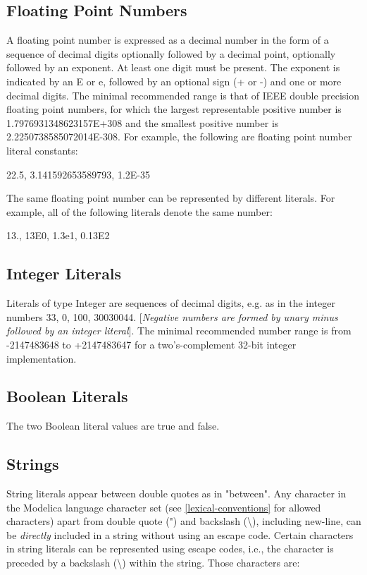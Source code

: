 \documentclass[10pt,a4paper]{report}
\def\doublelabel#1{\label{#1}}
\begin{document}
\subsection{Floating Point Numbers}\doublelabel{floating-point-numbers}

A floating point number is expressed as a decimal number in the form of
a sequence of decimal digits optionally followed by a decimal point,
optionally followed by an exponent. At least one digit must be present.
The exponent is indicated by an E or e, followed by an optional sign (+
or -) and one or more decimal digits. The minimal recommended range is
that of IEEE double precision floating point numbers, for which the
largest representable positive number is 1.7976931348623157E+308 and the
smallest positive number is 2.2250738585072014E-308. For example, the
following are floating point number literal constants:

22.5, 3.141592653589793, 1.2E-35

The same floating point number can be represented by different literals.
For example, all of the following literals denote the same number:

13., 13E0, 1.3e1, 0.13E2

\subsection{Integer Literals}\doublelabel{integer-literals}

Literals of type Integer are sequences of decimal digits, e.g. as in the
integer numbers 33, 0, 100, 30030044. {[}\emph{Negative numbers are
formed by unary minus followed by an integer literal}{]}. The minimal
recommended number range is from -2147483648 to +2147483647 for a
two's-complement 32-bit integer implementation.

\subsection{Boolean Literals}\doublelabel{boolean-literals}

The two Boolean literal values are true and false.

\subsection{Strings}\doublelabel{strings}

String literals appear between double quotes as in "between". Any
character in the Modelica language character set (see \ref{lexical-conventions} for
allowed characters) apart from double quote (") and backslash
(\textbackslash{}), including new-line, can be \emph{directly} included
in a string without using an escape code. Certain characters in string
literals can be represented using escape codes, i.e., the character is
preceded by a backslash (\textbackslash{}) within the string. Those
characters are:
\end{document}
